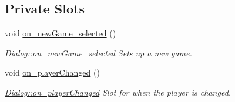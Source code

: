 \subsection*{Private Slots}
\begin{DoxyCompactItemize}
\item 
void \hyperlink{class_dialog_a07edaf041e6001503c4ef6291ca557ea}{on\-\_\-new\-Game\-\_\-selected} ()
\begin{DoxyCompactList}\small\item\em \hyperlink{class_dialog_a07edaf041e6001503c4ef6291ca557ea}{Dialog\-::on\-\_\-new\-Game\-\_\-selected} Sets up a new game. \end{DoxyCompactList}\item 
void \hyperlink{class_dialog_a87138e5c0a7a9fefab5549695686117a}{on\-\_\-player\-Changed} ()
\begin{DoxyCompactList}\small\item\em \hyperlink{class_dialog_a87138e5c0a7a9fefab5549695686117a}{Dialog\-::on\-\_\-player\-Changed} Slot for when the player is changed. \end{DoxyCompactList}\end{DoxyCompactItemize}
